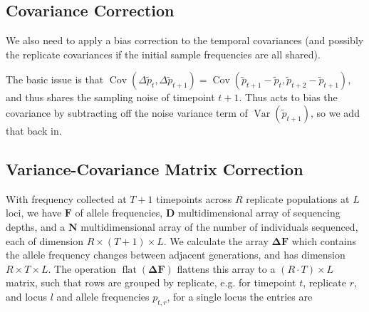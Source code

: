 \documentclass[11pt]{article}
\DeclareMathOperator{\var}{Var}
\DeclareMathOperator{\cov}{Cov}
\DeclareMathOperator{\flt}{\mathrm{flat}}
\begin{document}
\subsection{Covariance Correction}

We also need to apply a bias correction to the temporal covariances (and
possibly the replicate covariances if the initial sample frequencies are all
shared).

The basic issue is that $\cov(\Delta \widetilde{p}_t, \Delta
\widetilde{p}_{t+1}) = \cov(\widetilde{p}_{t+1} - \widetilde{p}_t,
\widetilde{p}_{t+2} - \widetilde{p}_{t+1})$, and thus shares the sampling noise
of timepoint $t+1$. Thus acts to bias the covariance by subtracting off the
noise variance term of $\var(\widetilde{p}_{t+1})$, so we add that back in.

\subsection{Variance-Covariance Matrix Correction}

With frequency collected at $T+1$ timepoints across $R$ replicate populations
at $L$ loci, we have $\mathbf{F}$ of allele frequencies, $\mathbf{D}$
multidimensional array of sequencing depths, and a $\mathbf{N}$
multidimensional array of the number of individuals sequenced, each of
dimension $R \times (T+1) \times L$.  We calculate the array $\mathbf{\Delta
F}$ which contains the allele frequency changes between adjacent generations,
and has dimension $R \times T \times L$.  The operation
$\flt(\mathbf{\Delta}\mathbf{F})$ flattens this array to a $(R \cdot T) \times
L$ matrix, such that rows are grouped by replicate, e.g. for timepoint $t$,
replicate $r$, and locus $l$ and allele frequencies $p_{t, r}$, for a single
locus the entries are 

\end{document}
